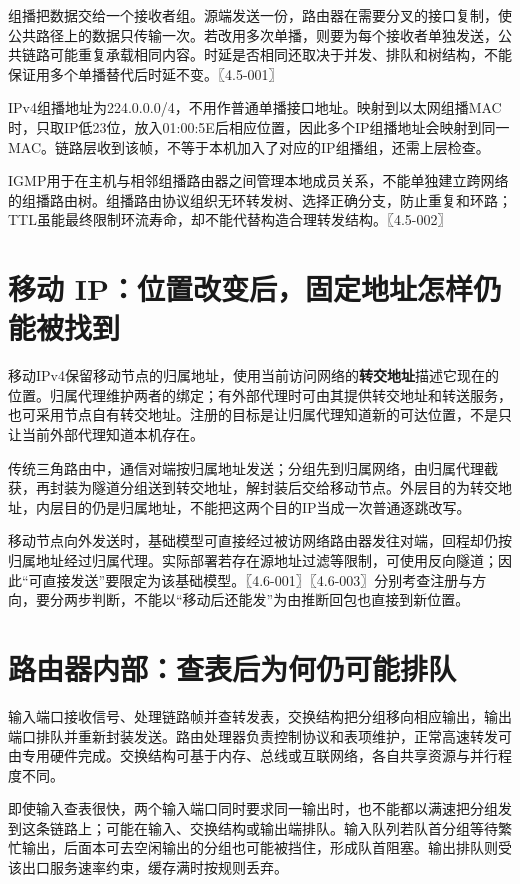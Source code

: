 组播把数据交给一个接收者组。源端发送一份，路由器在需要分叉的接口复制，使公共路径上的数据只传输一次。若改用多次单播，则要为每个接收者单独发送，公共链路可能重复承载相同内容。时延是否相同还取决于并发、排队和树结构，不能保证用多个单播替代后时延不变。〖4.5-001〗

IPv4组播地址为224.0.0.0/4，不用作普通单播接口地址。映射到以太网组播MAC时，只取IP低23位，放入01:00:5E后相应位置，因此多个IP组播地址会映射到同一MAC。链路层收到该帧，不等于本机加入了对应的IP组播组，还需上层检查。

IGMP用于在主机与相邻组播路由器之间管理本地成员关系，不能单独建立跨网络的组播路由树。组播路由协议组织无环转发树、选择正确分支，防止重复和环路；TTL虽能最终限制环流寿命，却不能代替构造合理转发结构。〖4.5-002〗

\section{移动 IP：位置改变后，固定地址怎样仍能被找到}\label{CN04-20}

移动IPv4保留移动节点的归属地址，使用当前访问网络的\textbf{转交地址}描述它现在的位置。归属代理维护两者的绑定；有外部代理时可由其提供转交地址和转送服务，也可采用节点自有转交地址。注册的目标是让归属代理知道新的可达位置，不是只让当前外部代理知道本机存在。

传统三角路由中，通信对端按归属地址发送；分组先到归属网络，由归属代理截获，再封装为隧道分组送到转交地址，解封装后交给移动节点。外层目的为转交地址，内层目的仍是归属地址，不能把这两个目的IP当成一次普通逐跳改写。

移动节点向外发送时，基础模型可直接经过被访网络路由器发往对端，回程却仍按归属地址经过归属代理。实际部署若存在源地址过滤等限制，可使用反向隧道；因此``可直接发送''要限定为该基础模型。〖4.6-001〗〖4.6-003〗分别考查注册与方向，要分两步判断，不能以``移动后还能发''为由推断回包也直接到新位置。

\section{路由器内部：查表后为何仍可能排队}\label{CN04-21}

输入端口接收信号、处理链路帧并查转发表，交换结构把分组移向相应输出，输出端口排队并重新封装发送。路由处理器负责控制协议和表项维护，正常高速转发可由专用硬件完成。交换结构可基于内存、总线或互联网络，各自共享资源与并行程度不同。

即使输入查表很快，两个输入端口同时要求同一输出时，也不能都以满速把分组发到这条链路上；可能在输入、交换结构或输出端排队。输入队列若队首分组等待繁忙输出，后面本可去空闲输出的分组也可能被挡住，形成队首阻塞。输出排队则受该出口服务速率约束，缓存满时按规则丢弃。

